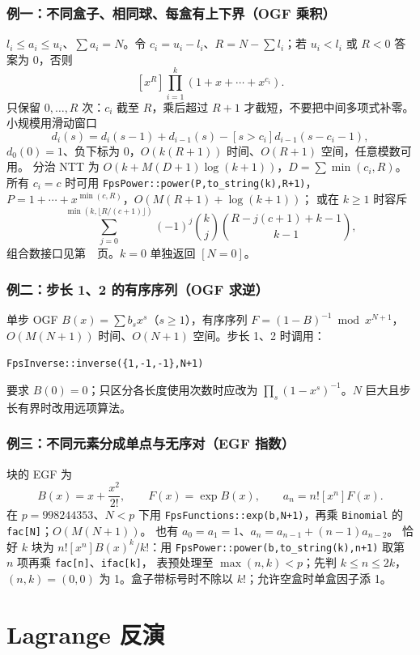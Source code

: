 \subsubsection{例一：不同盒子、相同球、每盒有上下界（OGF 乘积）}
$l_i\le a_i\le u_i$、$\sum a_i=N$。令 $c_i=u_i-l_i$、$R=N-\sum l_i$；若 $u_i<l_i$ 或 $R<0$ 答案为 0，否则
\[
[x^R]\prod_{i=1}^k(1+x+\cdots+x^{c_i}).
\]
只保留 $0,\ldots,R$ 次：$c_i$ 截至 $R$，乘后超过 $R+1$ 才截短，不要把中间多项式补零。
小规模用滑动窗口
\[
d_i(s)=d_i(s-1)+d_{i-1}(s)-[s>c_i]d_{i-1}(s-c_i-1),
\]
$d_0(0)=1$、负下标为 0，$O(k(R+1))$ 时间、$O(R+1)$ 空间，任意模数可用。
分治 NTT 为 $O(k+M(D+1)\log(k+1))$，$D=\sum\min(c_i,R)$。
所有 $c_i=c$ 时可用 \texttt{FpsPower::power(P,to\_string(k),R+1)}，$P=1+\cdots+x^{\min(c,R)}$，$O(M(R+1)+\log(k+1))$；
或在 $k\ge1$ 时容斥
\[
\sum_{j=0}^{\min(k,\lfloor R/(c+1)\rfloor)}
(-1)^j\binom kj\binom{R-j(c+1)+k-1}{k-1},
\]
组合数接口见第~\pageref{knowledge-binomial-choice}~页。$k=0$ 单独返回 $[N=0]$。

\subsubsection{例二：步长 1、2 的有序序列（OGF 求逆）}
单步 OGF $B(x)=\sum b_sx^s$（$s\ge1$），有序序列 $F=(1-B)^{-1}\bmod x^{N+1}$，$O(M(N+1))$ 时间、$O(N+1)$ 空间。步长 1、2 时调用：

\noindent\texttt{FpsInverse::inverse(\{1,-1,-1\},N+1)}


要求 $B(0)=0$；只区分各长度使用次数时应改为 $\prod_s(1-x^s)^{-1}$。$N$ 巨大且步长有界时改用远项算法。

\subsubsection{例三：不同元素分成单点与无序对（EGF 指数）}
块的 EGF 为
\[
B(x)=x+\frac{x^2}{2!},\qquad
F(x)=\exp B(x),\qquad a_n=n![x^n]F(x).
\]
在 $p=998244353$、$N<p$ 下用 \texttt{FpsFunctions::exp(b,N+1)}，再乘 \texttt{Binomial} 的 \texttt{fac[N]}；$O(M(N+1))$。
也有 $a_0=a_1=1$、$a_n=a_{n-1}+(n-1)a_{n-2}$。
恰好 $k$ 块为 $n![x^n]B(x)^k/k!$：用 \texttt{FpsPower::power(b,to\_string(k),n+1)} 取第 $n$ 项再乘 \texttt{fac[n]}、\texttt{ifac[k]}，
表预处理至 $\max(n,k)<p$；先判 $k\le n\le2k$，$(n,k)=(0,0)$ 为 1。盒子带标号时不除以 $k!$；允许空盒时单盒因子添 1。

\label{end-combinatorics-supplement}



\newpage

\section{Lagrange 反演}

